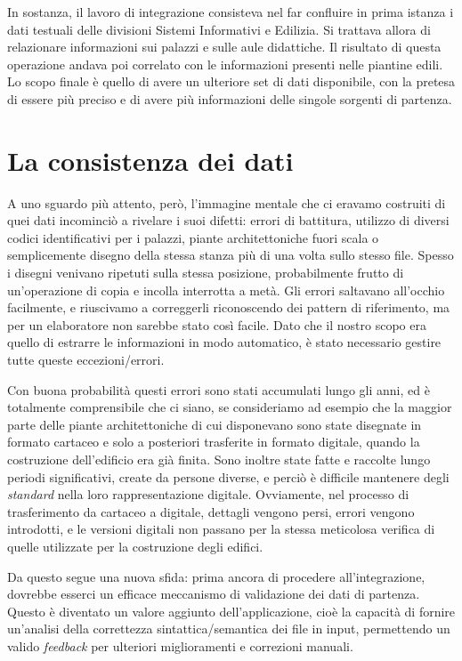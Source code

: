 \documentclass[12pt]{report}
\begin{document}
In sostanza, il lavoro di integrazione consisteva nel far confluire in
prima istanza i dati testuali delle divisioni Sistemi Informativi
e Edilizia. Si trattava allora di relazionare informazioni sui palazzi
e sulle aule didattiche. Il risultato di questa operazione andava 
poi correlato con le informazioni presenti nelle piantine edili. Lo scopo
finale è quello di avere un ulteriore set di dati disponibile, con la
pretesa di essere più preciso e di avere più informazioni delle
singole sorgenti di partenza.

\section{La consistenza dei dati}

A uno sguardo più attento, però, l'immagine mentale che ci eravamo
costruiti di quei dati incominciò a rivelare i suoi difetti: errori di battitura, 
utilizzo di diversi
codici identificativi per i palazzi, piante architettoniche fuori
scala o semplicemente disegno della stessa stanza più di una volta
sullo stesso file. Spesso i disegni venivano ripetuti sulla stessa
posizione, probabilmente frutto di un'operazione di copia e incolla
interrotta a metà. Gli errori saltavano all'occhio facilmente, e
riuscivamo a correggerli riconoscendo dei pattern di riferimento, ma per un
elaboratore non sarebbe stato così facile. Dato che il nostro scopo era 
quello di estrarre le informazioni in modo automatico, 
è stato necessario gestire tutte queste eccezioni/errori.

Con buona probabilità questi errori sono stati accumulati lungo gli
anni, ed è totalmente comprensibile che ci siano, se  consideriamo ad
esempio che la maggior parte delle piante architettoniche di cui
disponevano sono state disegnate in formato cartaceo e solo a posteriori
trasferite in formato digitale, quando la costruzione dell'edificio era già
finita. %
Sono inoltre state fatte e raccolte lungo periodi significativi,
create da persone diverse, e perciò è difficile mantenere degli
\textit{standard} nella loro rappresentazione digitale. Ovviamente, nel
processo di trasferimento da cartaceo a digitale, dettagli vengono persi,
errori vengono introdotti, e le versioni digitali non passano per la stessa
meticolosa verifica di quelle utilizzate per la costruzione degli edifici. 

Da questo segue una nuova sfida: prima ancora di procedere all'integrazione,
dovrebbe esserci un efficace meccanismo di validazione dei dati di partenza.
Questo è diventato un valore aggiunto dell'applicazione, cioè la capacità di
fornire un'analisi della correttezza sintattica/semantica dei file in input, permettendo
un valido \textit{feedback} per ulteriori miglioramenti e correzioni manuali.
\end{document}
